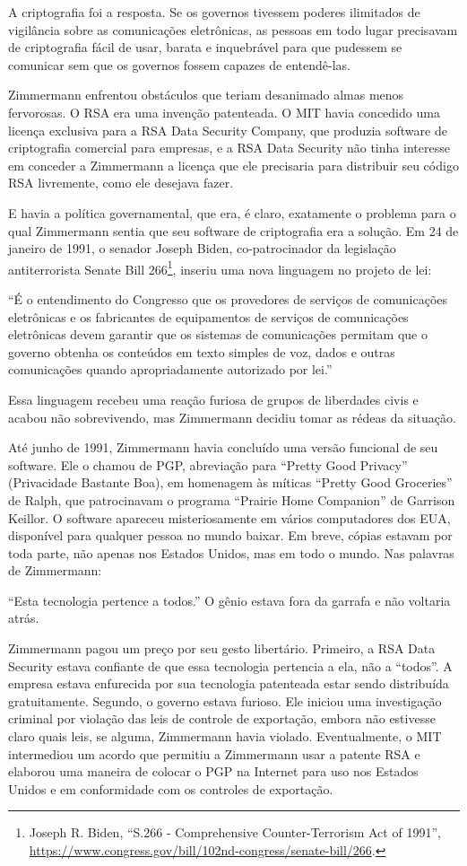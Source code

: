 \documentclass{book}
\begin{document}
A criptografia foi a resposta. Se os governos tivessem poderes ilimitados de vigilância sobre as comunicações eletrônicas, as pessoas em todo lugar precisavam de criptografia fácil de usar, barata e inquebrável para que pudessem se comunicar sem que os governos fossem capazes de entendê-las.

Zimmermann enfrentou obstáculos que teriam desanimado almas menos fervorosas. O RSA era uma invenção patenteada. O MIT havia concedido uma licença exclusiva para a RSA Data Security Company, que produzia software de criptografia comercial para empresas, e a RSA Data Security não tinha interesse em conceder a Zimmermann a licença que ele precisaria para distribuir seu código RSA livremente, como ele desejava fazer.

E havia a política governamental, que era, é claro, exatamente o problema para o qual Zimmermann sentia que seu software de criptografia era a solução. Em 24 de janeiro de 1991, o senador Joseph Biden, co-patrocinador da legislação antiterrorista Senate Bill 266\footnote{Joseph R. Biden, “S.266 - Comprehensive Counter-Terrorism Act of 1991”, \url{https://www.congress.gov/bill/102nd-congress/senate-bill/266}.}, inseriu uma nova linguagem no projeto de lei:

``É o entendimento do Congresso que os provedores de serviços de comunicações eletrônicas e os fabricantes de equipamentos de serviços de comunicações eletrônicas devem garantir que os sistemas de comunicações permitam que o governo obtenha os conteúdos em texto simples de voz, dados e outras comunicações quando apropriadamente autorizado por lei.''

Essa linguagem recebeu uma reação furiosa de grupos de liberdades civis e acabou não sobrevivendo, mas Zimmermann decidiu tomar as rédeas da situação.

Até junho de 1991, Zimmermann havia concluído uma versão funcional de seu software. Ele o chamou de PGP, abreviação para ``Pretty Good Privacy'' (Privacidade Bastante Boa), em homenagem às míticas ``Pretty Good Groceries'' de Ralph, que patrocinavam o programa ``Prairie Home Companion'' de Garrison Keillor. O software apareceu misteriosamente em vários computadores dos EUA, disponível para qualquer pessoa no mundo baixar. Em breve, cópias estavam por toda parte, não apenas nos Estados Unidos, mas em todo o mundo. Nas palavras de Zimmermann:

``Esta tecnologia pertence a todos.'' O gênio estava fora da garrafa e não voltaria atrás.

Zimmermann pagou um preço por seu gesto libertário. Primeiro, a RSA Data Security estava confiante de que essa tecnologia pertencia a ela, não a ``todos''. A empresa estava enfurecida por sua tecnologia patenteada estar sendo distribuída gratuitamente. Segundo, o governo estava furioso. Ele iniciou uma investigação criminal por violação das leis de controle de exportação, embora não estivesse claro quais leis, se alguma, Zimmermann havia violado. Eventualmente, o MIT intermediou um acordo que permitiu a Zimmermann usar a patente RSA e elaborou uma maneira de colocar o PGP na Internet para uso nos Estados Unidos e em conformidade com os controles de exportação.
\end{document}
